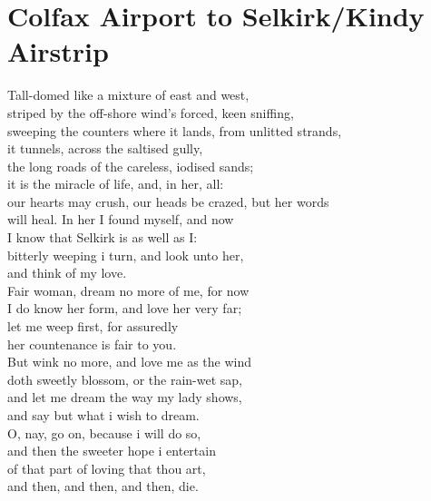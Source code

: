 \documentclass[smalldemyvopaper,11pt,twoside,onecolumn,openright,extrafontsizes]{memoir}
\begin{document}
\chapter{Colfax Airport to Selkirk/Kindy Airstrip}
Tall-domed like a mixture of east and west,
\\striped by the off-shore wind's forced, keen sniffing,
\\sweeping the counters where it lands, from unlitted strands,
\\it tunnels, across the saltised gully,
\\the long roads of the careless, iodised sands;
\\it is the miracle of life, and, in her, all:
\\our hearts may crush, our heads be crazed, but her words
\\will heal. In her I found myself, and now
\\I know that Selkirk is as well as I:
\\bitterly weeping i turn, and look unto her,
\\and think of my love.
\\Fair woman, dream no more of me, for now
\\I do know her form, and love her very far;
\\let me weep first, for assuredly
\\her countenance is fair to you.
\\But wink no more, and love me as the wind
\\doth sweetly blossom, or the rain-wet sap,
\\and let me dream the way my lady shows,
\\and say but what i wish to dream.
\\O, nay, go on, because i will do so,
\\and then the sweeter hope i entertain
\\of that part of loving that thou art,
\\and then, and then, and then, die.
\end{document}
